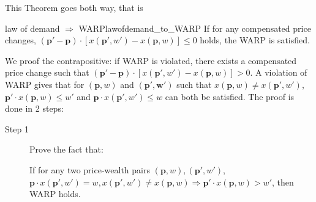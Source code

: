 This Theorem goes both way, that is
\begin{theorem}{law of demand $\Rightarrow$ WARP}{lawofdemand_to_WARP}
    If for any compensated price changes, $(\mathbf{p}'-\mathbf{p})\cdot[ x(\mathbf{p}',w')- x(\mathbf{p},w)]\leq 0$ holds, the WARP is satisfied.
\end{theorem}
We proof the contrapositive: if WARP is violated, there exists a compensated price change such that $(\mathbf{p}'-\mathbf{p})\cdot[ x(\mathbf{p}',w')- x(\mathbf{p},w)]>0$. A violation of WARP gives that for $(\mathbf{p},w)$ and $(\mathbf{\mathbf{p}',w'})$ such that $ x(\mathbf{p},w)\neq  x(\mathbf{p}',w')$, $\mathbf{p}'\cdot  x(\mathbf{p},w)\leq w'$ and $\mathbf{p}\cdot  x(\mathbf{p}',w')\leq w$ can both be satisfied. The proof is done in 2 steps:
\begin{description}
    \item[Step 1] Prove the fact that: 
    
    If for any two price-wealth pairs $(\mathbf{p},w),(\mathbf{p}',w')$, $\mathbf{p}\cdot x(\mathbf{p}',w')=w, x(\mathbf{p}',w')\neq  x(\mathbf{p},w)\Rightarrow \mathbf{p}'\cdot  x(\mathbf{p},w)>w'$, then WARP holds. 
    

\end{description}
